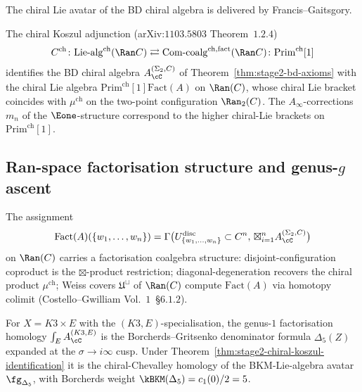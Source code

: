 The chiral Lie avatar of the BD chiral algebra is delivered by Francis--Gaitsgory.

\begin{theorem}
\label{thm:stage2-chiral-koszul-identification}
The chiral Koszul adjunction (arXiv:$1103.5803$ Theorem~$1.2.4$)
\[
 C^{\mathrm{ch}}\colon
 \mathrm{Lie}\text{-}\mathrm{alg}^{\mathrm{ch}}(\Ran C)
 \rightleftarrows
 \mathrm{Com}\text{-}\mathrm{coalg}^{\mathrm{ch,fact}}(\Ran C)
 \colon\mathrm{Prim}^{\mathrm{ch}}[1]
\]
identifies the BD chiral algebra $A_\cC^{(\Sigma_2,C)}$ of Theorem~\ref{thm:stage2-bd-axioms} with the chiral Lie algebra $\mathrm{Prim}^{\mathrm{ch}}[1]\mathrm{Fact}(A)$ on $\Ran(C)$, whose chiral Lie bracket coincides with $\mu^{\mathrm{ch}}$ on the two-point configuration $\Ran_2(C)$. The $A_\infty$-corrections $m_n$ of the $\Eone$-structure correspond to the higher chiral-Lie brackets on $\mathrm{Prim}^{\mathrm{ch}}[1]$.
\end{theorem}

\subsection{Ran-space factorisation structure and genus-\texorpdfstring{$g$}{g} ascent}
\label{subsec:stage2-ran-genus-g}

\begin{theorem}
\label{thm:stage2-ran-factorisation}
The assignment
\[
 \mathrm{Fact}(A)(\{w_1,\ldots,w_n\})
 =\Gamma\bigl(U^{\mathrm{disc}}_{\{w_1,\ldots,w_n\}}\subset C^n,\,
 \boxtimes_{i=1}^n A_\cC^{(\Sigma_2,C)}\bigr)
\]
on $\Ran(C)$ carries a factorisation coalgebra structure: disjoint-configuration coproduct is the $\boxtimes$-product restriction; diagonal-degeneration recovers the chiral product $\mu^{\mathrm{ch}}$; Weiss covers $\mathfrak U^\sqcup$ of $\Ran(C)$ compute $\mathrm{Fact}(A)$ via homotopy colimit (Costello--Gwilliam Vol.~$1$~\S$6.1.2$).
\end{theorem}

\begin{corollary}
\label{cor:stage2-k3e-modular-ascent}
For $X=K3\times E$ with the $(K3,E)$-specialisation, the genus-$1$ factorisation homology $\int_E A_\cC^{(K3,E)}$ is the Borcherds--Gritsenko denominator formula $\Delta_5(Z)$ expanded at the $\sigma\to i\infty$ cusp. Under Theorem~\ref{thm:stage2-chiral-koszul-identification} it is the chiral-Chevalley homology of the BKM-Lie-algebra avatar $\fg_{\Delta_5}$, with Borcherds weight $\kBKM(\Delta_5)=c_1(0)/2=5$.
\end{corollary}

